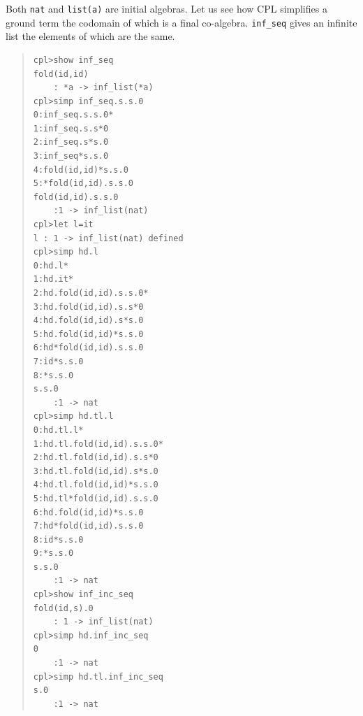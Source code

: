 Both \verb"nat" and \verb"list(a)" are initial algebras.  Let us see how CPL
simplifies a ground term the codomain of which is a final co-algebra.
 \verb"inf_seq" gives an infinite list the elements of which are the same.
\begin{quote}
\begin{verbatim}
cpl>show inf_seq
fold(id,id)
    : *a -> inf_list(*a)
cpl>simp inf_seq.s.s.0
0:inf_seq.s.s.0*
1:inf_seq.s.s*0
2:inf_seq.s*s.0
3:inf_seq*s.s.0
4:fold(id,id)*s.s.0
5:*fold(id,id).s.s.0
fold(id,id).s.s.0
    :1 -> inf_list(nat)
cpl>let l=it
l : 1 -> inf_list(nat) defined
cpl>simp hd.l
0:hd.l*
1:hd.it*
2:hd.fold(id,id).s.s.0*
3:hd.fold(id,id).s.s*0
4:hd.fold(id,id).s*s.0
5:hd.fold(id,id)*s.s.0
6:hd*fold(id,id).s.s.0
7:id*s.s.0
8:*s.s.0
s.s.0
    :1 -> nat
cpl>simp hd.tl.l
0:hd.tl.l*
1:hd.tl.fold(id,id).s.s.0*
2:hd.tl.fold(id,id).s.s*0
3:hd.tl.fold(id,id).s*s.0
4:hd.tl.fold(id,id)*s.s.0
5:hd.tl*fold(id,id).s.s.0
6:hd.fold(id,id)*s.s.0
7:hd*fold(id,id).s.s.0
8:id*s.s.0
9:*s.s.0
s.s.0
    :1 -> nat
cpl>show inf_inc_seq
fold(id,s).0
    : 1 -> inf_list(nat)
cpl>simp hd.inf_inc_seq
0
    :1 -> nat
cpl>simp hd.tl.inf_inc_seq
s.0
    :1 -> nat
\end{verbatim}
\end{quote}


